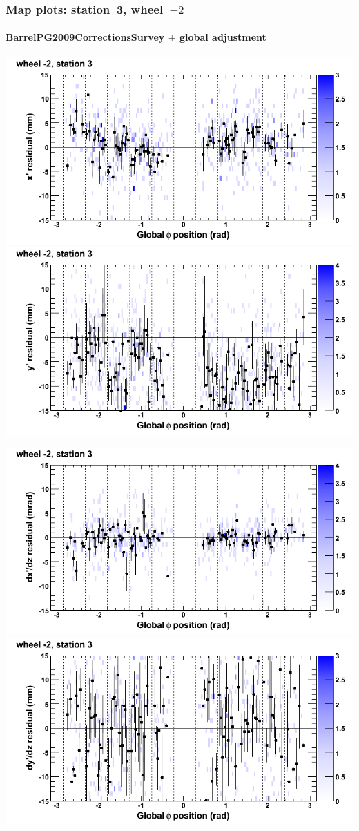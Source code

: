 \documentclass[compress]{beamer}
\begin{document}
\begin{frame}
\frametitle{Map plots: station~3, wheel~$-2$}
\framesubtitle{BarrelPG2009CorrectionsSurvey $+$ global adjustment}
\includegraphics[width=0.5\linewidth]{mapplots_re01/DTvsphi_st3whA_x.png}
\includegraphics[width=0.5\linewidth]{mapplots_re01/DTvsphi_st3whA_y.png}

\includegraphics[width=0.5\linewidth]{mapplots_re01/DTvsphi_st3whA_dxdz.png}
\includegraphics[width=0.5\linewidth]{mapplots_re01/DTvsphi_st3whA_dydz.png}
\end{frame}
\end{document}
